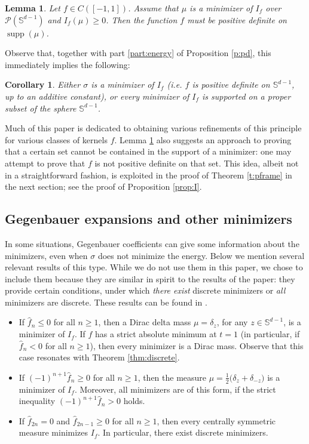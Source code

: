 \documentclass[11pt, leqno]{amsart}
\def\S{\mathbb S}
\newtheorem{lemma}[theorem]{Lemma}
\newtheorem{corollary}[theorem]{Corollary}
\theoremstyle{definition}
\numberwithin{equation}{section}
\begin{document}
\begin{lemma}\label{lem:positive_semidef}
Let  $f \in C([-1,1])$. Assume  that  $\mu$ is a minimizer of $I_f$ over $\mathcal P( \S^{d-1})$ and  $I_f (\mu ) \ge 0$. 
Then the function $f$ must be positive definite on $\operatorname{supp} (\mu)$.
\end{lemma}


\noindent Observe that, together with part  \eqref{part:energy} of Proposition \ref{p:pd},  this immediately implies the following: %
\begin{corollary}\label{cor:dich}
{{Either  $\sigma$ is  a minimizer of $I_f$ (i.e. $f$ is  positive definite on $\S^{d-1}$, up to an additive constant), or every  minimizer of $I_f$ is supported on a proper subset of the sphere $\mathbb S^{d-1}$.}}
\end{corollary} 

Much of this paper is dedicated to obtaining various refinements of this principle for various classes of kernels  $f$. Lemma \ref{lem:positive_semidef} also suggests an approach to proving that a certain set cannot be contained in the support of a minimizer: one may attempt to prove that $f$ is not positive definite on that set. This idea, albeit not in a straightforward fashion, is exploited  in the proof of Theorem \ref{t:pframe} in the next section; see the proof of Proposition \ref{prop:I}. 

\subsection{Gegenbauer expansions and other minimizers}
In some situations, Gegenbauer coefficients can give some information about the minimizers, even when $\sigma$ does not minimize the energy.  Below we mention several relevant results of this type. While we do not use them in this paper, we chose to include them because they are similar in spirit to the results of the paper: they provide certain conditions, under which {\em{there exist}} discrete minimizers or {\em{all}} minimizers are discrete. These results can be found in \cite{bilyk2018geodesic}.

\begin{itemize}
\item If $\widehat f_n \le 0$ for all $n\ge 1$, then a Dirac delta mass $\mu = \delta_z$, for any $z\in \S^{d-1}$, is a minimizer of $I_f$. If $f$ has a strict  absolute minimum at $t=1$ (in particular, if $\widehat f_n < 0$ for all $n\ge 1$), then every minimizer is a Dirac mass. Observe that this case resonates with Theorem \ref{thm:discrete}.
 \item If $(-1)^{n+1} \widehat f_n \ge 0$ for all $n\ge 1$, then  the measure $\mu = \frac12 \big(\delta_z + \delta_{-z}  \big)$ is a minimizer of $I_f$. Moreover, all minimizers are of this form, if  the strict inequality $(-1)^{n+1} \widehat f_n > 0$ holds.  
\item If $\widehat f_{2n} = 0$  and $\widehat f_{2n-1} \ge 0$ for all $n\ge 1$, then every centrally symmetric measure minimizes $I_f$. In particular, there exist discrete minimizers. 
\end{itemize}
\end{document}
